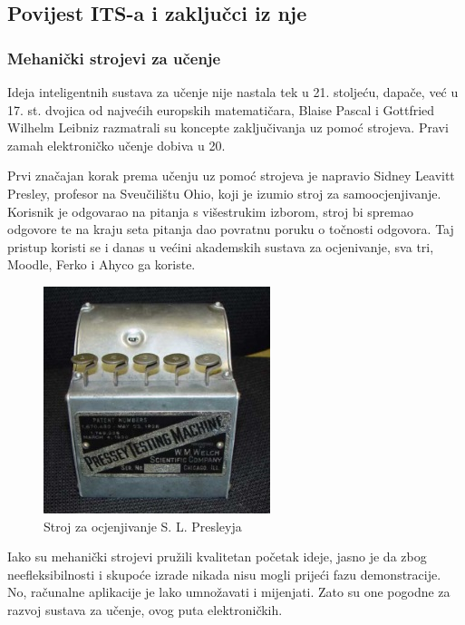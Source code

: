 \documentclass[times, utf8, zavrsni]{fer}
\begin{document}
\subsection{Povijest ITS-a i zaključci iz nje}

\subsubsection{Mehanički strojevi za učenje}
Ideja inteligentnih sustava za učenje nije nastala tek u 21. stoljeću, dapače, već u 17. st. dvojica od najvećih europskih matematičara, Blaise Pascal i Gottfried Wilhelm Leibniz razmatrali su koncepte zaključivanja uz pomoć strojeva. Pravi zamah elektroničko učenje dobiva u 20.
\par
Prvi značajan korak prema učenju uz pomoć strojeva je napravio Sidney Leavitt Presley, profesor na Sveučilištu Ohio, koji je izumio stroj za samoocjenjivanje. Korisnik je odgovarao na pitanja s višestrukim izborom, stroj bi spremao odgovore te na kraju seta pitanja dao povratnu poruku o točnosti odgovora. Taj pristup koristi se i danas u većini akademskih sustava za ocjenivanje, sva tri, Moodle, Ferko i Ahyco ga koriste.

\begin{figure}[htb]
	\centering
	\includegraphics[]{img/pressey.jpg}
	\caption{Stroj za ocjenjivanje S. L. Presleyja}
	\label{fig:pressey}
\end{figure}

Iako su mehanički strojevi pružili kvalitetan početak ideje, jasno je da zbog neefleksibilnosti i skupoće izrade nikada nisu mogli prijeći fazu demonstracije. No, računalne aplikacije je lako umnožavati i mijenjati. Zato su one pogodne za razvoj sustava za učenje, ovog puta elektroničkih.
\end{document}
